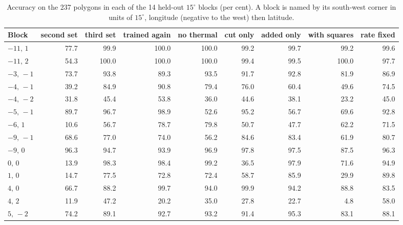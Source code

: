 \documentclass[twocolumn]{aastex701}
\begin{document}
\begin{table}[t]
\centering
\caption{Accuracy on the 237 polygons in each of the 14 held-out $15^{\circ}$ blocks (per cent). A block is named by its south-west corner in units of $15^{\circ}$, longitude (negative to the west) then latitude. \label{tab:perblock}}
\small
\begin{tabular}{lrrrrrrrr}
\hline\hline
Block & second set & third set & trained again & no thermal & cut only & added only & with squares & rate fixed \\
\hline
$-11,\,1$ & 77.7 & 99.9 & 100.0 & 100.0 & 99.2 & 99.7 & 99.2 & 99.6 \\
$-11,\,2$ & 54.3 & 100.0 & 100.0 & 100.0 & 99.4 & 99.5 & 100.0 & 97.7 \\
$-3,\,-1$ & 73.7 & 93.8 & 89.3 & 93.5 & 91.7 & 92.8 & 81.9 & 86.9 \\
$-4,\,-1$ & 39.2 & 84.9 & 90.8 & 79.4 & 76.0 & 60.4 & 49.6 & 74.5 \\
$-4,\,-2$ & 31.8 & 45.4 & 53.8 & 36.0 & 44.6 & 38.1 & 23.2 & 45.0 \\
$-5,\,-1$ & 89.7 & 96.7 & 98.9 & 52.6 & 95.2 & 56.7 & 69.6 & 92.8 \\
$-6,\,1$ & 10.6 & 56.7 & 78.7 & 79.8 & 50.7 & 47.7 & 62.2 & 71.5 \\
$-9,\,-1$ & 68.6 & 77.0 & 74.0 & 56.2 & 84.6 & 83.4 & 61.9 & 80.7 \\
$-9,\,0$ & 96.3 & 94.7 & 93.9 & 96.9 & 97.8 & 97.5 & 87.5 & 96.3 \\
$0,\,0$ & 13.9 & 98.3 & 98.4 & 99.2 & 36.5 & 97.9 & 71.6 & 94.9 \\
$1,\,0$ & 14.7 & 77.5 & 72.8 & 72.4 & 58.7 & 85.9 & 29.9 & 89.8 \\
$4,\,0$ & 66.7 & 88.2 & 99.7 & 94.0 & 99.9 & 94.2 & 88.8 & 83.5 \\
$4,\,2$ & 11.9 & 47.2 & 20.2 & 35.0 & 27.8 & 22.7 & 4.8 & 58.0 \\
$5,\,-2$ & 74.2 & 89.1 & 92.7 & 93.2 & 91.4 & 95.3 & 83.1 & 88.1 \\
\hline
\end{tabular}
\end{table}

\clearpage
{}

\end{document}
